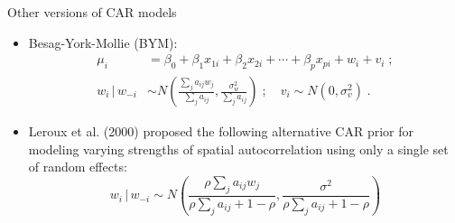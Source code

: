 \documentclass[10pt]{beamer}
\newcommand{\given}{\, | \,}
\begin{document}
\begin{frame}{Other versions of CAR models}

\begin{itemize}
 \item Besag-York-Mollie (BYM):
 \begin{equation*}
 \begin{split}
  \mu_i &= \beta_0 + \beta_1 x_{1i} + \beta_2 x_{2i} + \cdots + \beta_p x_{pi} + w_i + v_i\;; \\
  w_i \given w_{-i} &\sim N\left(\frac{\sum_{j} a_{ij} w_j}{\sum_{j}a_{ij}}, \frac{\sigma_w^2}{\sum_{j} a_{ij}} \right)\;;\quad v_i \sim N(0,\sigma_v^2)\;. 
 \end{split}
 \end{equation*}

 \item Leroux et al. (2000) proposed the following alternative CAR prior for modeling varying strengths of spatial autocorrelation using only a single set of random effects:
 \begin{equation*}
		w_i \given w_{-i} \sim N\left(\frac{\rho\sum_{j} a_{ij} w_j}{\rho\sum_{j} a_{ij} + 1 - \rho}, \frac{\sigma^2}{\rho \sum_{j} a_{ij} + 1 - \rho}\right)
		\end{equation*}
\end{itemize}

\end{frame}
\end{document}
